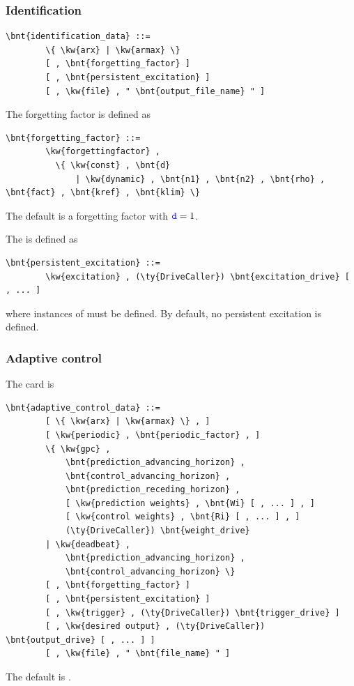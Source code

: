 \subsubsection{Identification}
\begin{Verbatim}[commandchars=\\\{\}]
    \bnt{identification_data} ::=
        \{ \kw{arx} | \kw{armax} \}
        [ , \bnt{forgetting_factor} ]
        [ , \bnt{persistent_excitation} ]
        [ , \kw{file} , " \bnt{output_file_name} " ]
\end{Verbatim}
The forgetting factor is defined as
\begin{Verbatim}[commandchars=\\\{\}]
    \bnt{forgetting_factor} ::=
        \kw{forgettingfactor} ,
          \{ \kw{const} , \bnt{d}
              | \kw{dynamic} , \bnt{n1} , \bnt{n2} , \bnt{rho} , \bnt{fact} , \bnt{kref} , \bnt{klim} \}
\end{Verbatim}
The default is a  forgetting factor with $\textcolor{blue}{\texttt{d}}=1$.

The  is defined as
\begin{Verbatim}[commandchars=\\\{\}]
    \bnt{persistent_excitation} ::=
        \kw{excitation} , (\ty{DriveCaller}) \bnt{excitation_drive} [ , ... ]
\end{Verbatim}
where  instances of  must be defined.
By default, no persistent excitation is defined.

\subsubsection{Adaptive control}
The  card is
\begin{Verbatim}[commandchars=\\\{\}]
    \bnt{adaptive_control_data} ::=
        [ \{ \kw{arx} | \kw{armax} \} , ]
        [ \kw{periodic} , \bnt{periodic_factor} , ]
        \{ \kw{gpc} ,
            \bnt{prediction_advancing_horizon} ,
            \bnt{control_advancing_horizon} ,
            \bnt{prediction_receding_horizon} ,
            [ \kw{prediction weights} , \bnt{Wi} [ , ... ] , ]
            [ \kw{control weights} , \bnt{Ri} [ , ... ] , ]
            (\ty{DriveCaller}) \bnt{weight_drive}
        | \kw{deadbeat} ,
            \bnt{prediction_advancing_horizon} ,
            \bnt{control_advancing_horizon} \}
        [ , \bnt{forgetting_factor} ]
        [ , \bnt{persistent_excitation} ]
        [ , \kw{trigger} , (\ty{DriveCaller}) \bnt{trigger_drive} ]
        [ , \kw{desired output} , (\ty{DriveCaller}) \bnt{output_drive} [ , ... ] ]
        [ , \kw{file} , " \bnt{file_name} " ]
\end{Verbatim}
The default is .

